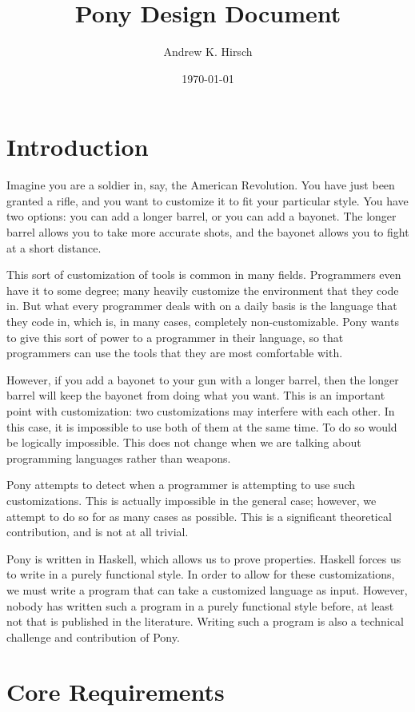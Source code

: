 \documentclass[11pt]{article}
\title{Pony Design Document}
\author{Andrew K. Hirsch}
\date{\today}
\begin{document}
\maketitle


\section{Introduction}
\label{sec-1}


Imagine you are a soldier in, say, the American Revolution. You have just been granted a rifle, and you want to customize it to fit your particular style. You have two options: you can add a longer barrel, or you can add a bayonet. The longer barrel allows you to take more accurate shots, and the bayonet allows you to fight at a short distance.

This sort of customization of tools is common in many fields. Programmers even have it to some degree; many heavily customize the environment that they code in. But what every programmer deals with on a daily basis is the language that they code in, which is, in many cases, completely non-customizable. Pony wants to give this sort of power to a programmer in their language, so that programmers can use the tools that they are most comfortable with.

However, if you add a bayonet to your gun with a longer barrel, then the longer barrel will keep the bayonet from doing what you want. This is an important point with customization: two customizations may interfere with each other. In this case, it is impossible to use both of them at the same time. To do so would be logically impossible. This does not change when we are talking about programming languages rather than weapons.

Pony attempts to detect when a programmer is attempting to use such customizations. This is actually impossible in the general case; however, we attempt to do so for as many cases as possible. This is a significant theoretical contribution, and is not at all trivial.

Pony is written in Haskell, which allows us to prove properties. Haskell forces us to write in a purely functional style. In order to allow for these customizations, we must write a program that can take a customized language as input. However, nobody has written such a program in a purely functional style before, at least not that is published in the literature. Writing such a program is also a technical challenge and contribution of Pony.
\section{Core Requirements}
\label{sec-2}
\end{document}
